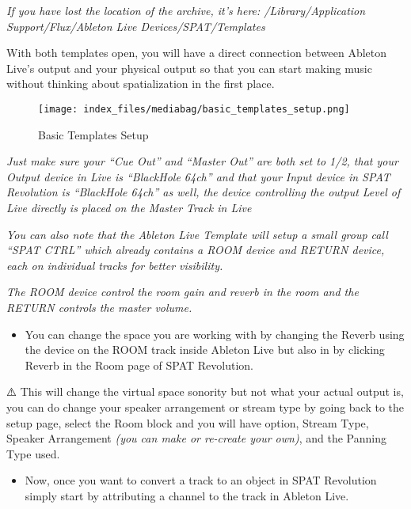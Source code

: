 \documentclass[
  letterpaper,
  DIV=11,
  numbers=noendperiod]{scrreport}
\providecommand{\tightlist}{%
  \setlength{\itemsep}{0pt}\setlength{\parskip}{0pt}}\usepackage{longtable,booktabs,array}
\begin{document}
\emph{If you have lost the location of the archive, it's here:
/Library/Application Support/Flux/Ableton Live Devices/SPAT/Templates}

With both templates open, you will have a direct connection between
Ableton Live's output and your physical output so that you can start
making music without thinking about spatialization in the first place.

\begin{figure}

{\centering \texttt{[image: index\_files/mediabag/basic\_templates\_setup.png]}

}

\caption{Basic Templates Setup}

\end{figure}

\emph{Just make sure your ``Cue Out'' and ``Master Out'' are both set to
1/2, that your Output device in Live is ``BlackHole 64ch'' and that your
Input device in SPAT Revolution is ``BlackHole 64ch'' as well, the
device controlling the output Level of Live directly is placed on the
Master Track in Live}

\emph{You can also note that the Ableton Live Template will setup a
small group call ``SPAT CTRL'' which already contains a ROOM device and
RETURN device, each on individual tracks for better visibility.}

\emph{The ROOM device control the room gain and reverb in the room and
the RETURN controls the master volume.}

\begin{itemize}
\tightlist
\item
  You can change the space you are working with by changing the Reverb
  using the device on the ROOM track inside Ableton Live but also in by
  clicking Reverb in the Room page of SPAT Revolution.
\end{itemize}

⚠️ This will change the virtual space sonority but not what your actual
output is, you can do change your speaker arrangement or stream type by
going back to the setup page, select the Room block and you will have
option, Stream Type, Speaker Arrangement \emph{(you can make or
re-create your own)}, and the Panning Type used.

\begin{itemize}
\tightlist
\item
  Now, once you want to convert a track to an object in SPAT Revolution
  simply start by attributing a channel to the track in Ableton Live.
\end{itemize}
\end{document}
